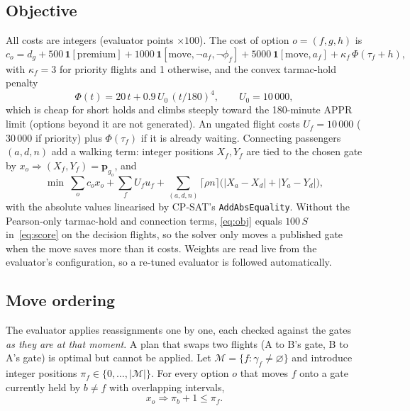 \documentclass[11pt]{article}
\theoremstyle{remark}
\newcommand{\ind}[1]{\mathbf{1}\!\left[#1\right]}
\begin{document}
\subsection{Objective}
All costs are integers (evaluator points $\times100$). The cost of option $o=(f,g,h)$ is
\begin{equation}
c_o = d_g + 500\,\ind{\text{premium}} + 1000\,\ind{\text{move},\neg a_f,\neg\phi_f}
      + 5000\,\ind{\text{move}, a_f} + \kappa_f\,\Phi(\tau_f+h),
\end{equation}
with $\kappa_f=3$ for priority flights and 1 otherwise, and the convex tarmac-hold penalty
\begin{equation}
\Phi(t) = 20\,t + 0.9\,U_0\,(t/180)^4,\qquad U_0=10\,000,
\label{eq:hold}
\end{equation}
which is cheap for short holds and climbs steeply toward the 180-minute APPR limit (options beyond
it are not generated). An ungated flight costs $U_f = 10\,000$ ($30\,000$ if priority) plus
$\Phi(\tau_f)$ if it is already waiting. Connecting passengers $(a,d,n)$ add a walking term: integer
positions $X_f,Y_f$ are tied to the chosen gate by $x_o \Rightarrow (X_f,Y_f)=\mathbf{p}_{g_o}$, and
\begin{equation}
\min\ \sum_{o}c_o x_o + \sum_f U_f u_f + \sum_{(a,d,n)} \lceil \rho n \rceil\big(|X_a-X_d|+|Y_a-Y_d|\big),
\label{eq:obj}
\end{equation}
with the absolute values linearised by CP-SAT's \texttt{AddAbsEquality}. Without the Pearson-only
tarmac-hold and connection terms, \eqref{eq:obj} equals $100\,S$ in~\eqref{eq:score} on the decision
flights, so the
solver only moves a published gate when the move saves more than it costs. Weights are read live
from the evaluator's configuration, so a re-tuned evaluator is followed automatically.

\subsection{Move ordering}\label{sec:order}
The evaluator applies reassignments one by one, each checked against the gates \emph{as they are at
that moment}. A plan that swaps two flights (A to B's gate, B to A's gate) is optimal but cannot be
applied. Let $\mathcal{M}=\{f:\gamma_f\ne\varnothing\}$ and introduce integer positions
$\pi_f\in\{0,\dots,|\mathcal{M}|\}$. For every option $o$ that moves $f$ onto a gate currently held by
$b\ne f$ with overlapping intervals,
\begin{equation}
x_o \Rightarrow \pi_b + 1 \le \pi_f.
\label{eq:order}
\end{equation}
\end{document}
